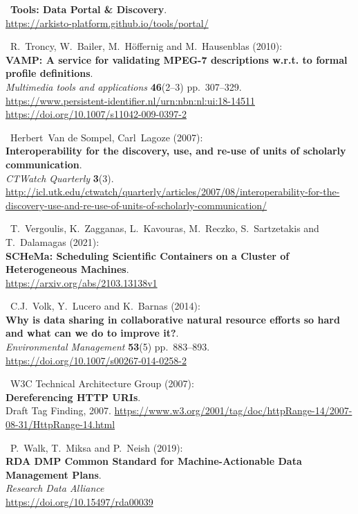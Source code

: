 \begin{thebibliography}{9}
~\textbf{Tools: Data Portal \& Discovery}.\\
\url{https://arkisto-platform.github.io/tools/portal/}

~R.~Troncy, W.~Bailer, M.~Höffernig and M.~Hausenblas (2010):\\
\textbf{VAMP: A service for validating MPEG-7 descriptions w.r.t. to
formal profile definitions}.\\
\emph{Multimedia tools and applications} \textbf{46}(2--3)
pp.~307--329.\\
\url{https://www.persistent-identifier.nl/urn:nbn:nl:ui:18-14511}~\\
\url{https://doi.org/10.1007/s11042-009-0397-2}

~Herbert~Van de Sompel, Carl~Lagoze (2007):\\
\textbf{Interoperability for the discovery, use, and re-use of units of
scholarly communication}.\\
\emph{CTWatch Quarterly} \textbf{3}(3).\\
\url{http://icl.utk.edu/ctwatch/quarterly/articles/2007/08/interoperability-for-the-discovery-use-and-re-use-of-units-of-scholarly-communication/}

~T.~Vergoulis, K.~Zagganas, L.~Kavouras, M.~Reczko,
S.~Sartzetakis and T.~Dalamagas (2021):\\
\textbf{SCHeMa: Scheduling Scientific Containers on a Cluster of
Heterogeneous Machines}.\\
\url{https://arxiv.org/abs/2103.13138v1}

~C.J.~Volk, Y.~Lucero and K.~Barnas (2014):\\
\textbf{Why is data sharing in collaborative natural resource efforts so
hard and what can we do to improve it?}.\\
\emph{Environmental Management} \textbf{53}(5) pp.~883--893.\\
\url{https://doi.org/10.1007/s00267-014-0258-2}

~W3C Technical Architecture Group (2007):\\
\textbf{Dereferencing HTTP URIs}.\\
Draft Tag Finding, 2007.
\url{https://www.w3.org/2001/tag/doc/httpRange-14/2007-08-31/HttpRange-14.html}

~P.~Walk, T.~Miksa and P.~Neish (2019):\\
\textbf{RDA DMP Common Standard for Machine-Actionable Data Management
Plans}.\\
\emph{Research Data Alliance}\\
\url{https://doi.org/10.15497/rda00039}


\end{thebibliography}
